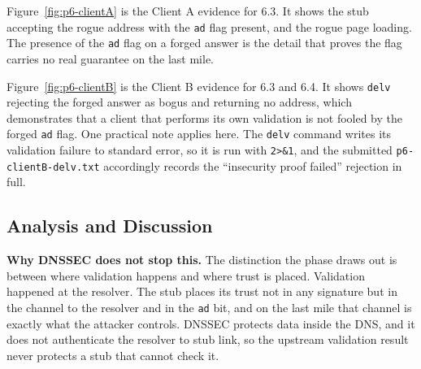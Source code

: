\documentclass[11pt]{article}
\begin{document}

Figure~\ref{fig:p6-clientA} is the Client A evidence for 6.3. It
shows the stub accepting the rogue address with the \texttt{ad} flag present,
and the rogue page loading. The presence of the \texttt{ad} flag on a forged answer
is the detail that proves the flag carries no real guarantee on the last mile.


Figure~\ref{fig:p6-clientB} is the Client B evidence for 6.3 and
6.4. It shows \texttt{delv} rejecting the forged answer as bogus and
returning no address, which demonstrates that a client that performs its own
validation is not fooled by the forged \texttt{ad} flag. One practical note applies
here. The \texttt{delv} command writes its validation failure to standard error, so
it is run with \texttt{2>\&1}, and the submitted \texttt{p6-clientB-delv.txt}
accordingly records the ``insecurity proof failed'' rejection in full.

\subsection{Analysis and Discussion}

\textbf{Why DNSSEC does not stop this.} The distinction the phase draws out is
between where validation happens and where trust is placed. Validation happened at
the resolver. The stub places its trust not in any signature but in the channel to
the resolver and in the \texttt{ad} bit, and on the last mile that channel is
exactly what the attacker controls. DNSSEC protects data inside the DNS, and it does
not authenticate the resolver to stub link, so the upstream validation result never
protects a stub that cannot check it.
\end{document}
